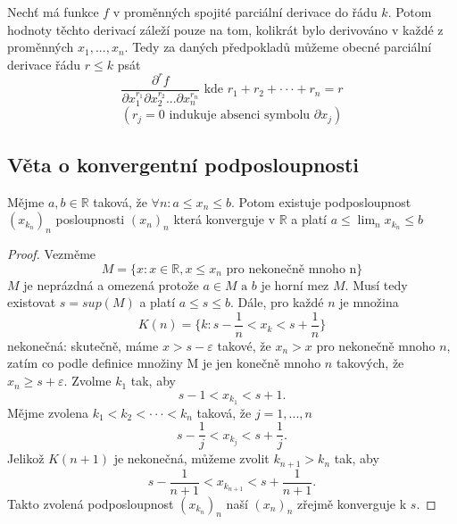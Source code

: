 \documentclass[../main.tex]{subfiles}
\begin{document}
\begin{consequence}
	Nechť má funkce $f$ v proměnných spojité parciální derivace do řádu $k$. Potom hodnoty těchto derivací
	záleží pouze na tom, kolikrát bylo derivováno v každé z proměnných $x_1, ... , x_n$.
	Tedy za daných předpokladů můžeme obecné parciální derivace řádu $r \leq k$ psát
	\[\frac{\partial ^r f}{\partial x^{r_1}_1 \partial x^{r_2}_2 ... \partial x_n^{r_n}} \text{ kde } r_1 + r_2 + \cdot \cdot \cdot + r_n = r \]
	\[(r_j = 0 \text{ indukuje absenci symbolu } \partial x_j)\]
\end{consequence}

\subsection{Věta o konvergentní podposloupnosti}
\begin{theorem}
	Mějme $a,b \in \mathbb{R}$ taková, že $\forall n: a \leq x_n \leq b$. Potom existuje podposloupnost
	$(x_{k_n})_n$ posloupnosti $(x_n)_n$ která konverguje v $\mathbb{R}$ a platí
	$a \leq \lim_n x_{k_n} \leq b$
\end{theorem}

\begin{proof}
	Vezměme \[M = \{x : x \in \mathbb{R}, x \leq x_n \text{ pro nekonečně mnoho n}\}\]
	$M$ je neprázdná a omezená protože $a \in M \text{ a } b$ je horní mez $M$. Musí tedy existovat $s = sup(M)$ a platí 
	$a \leq s \leq b$. Dále, pro každé $n$ je množina 
	\[K(n) = \{k : s - \frac{1}{n} < x_k < s + \frac{1}{n}\}\]
	nekonečná: skutečně, máme $x > s - \varepsilon$ takové, že $x_n > x$ pro nekonečně mnoho $n$, zatím co podle definice množiny M je jen
	konečně mnoho $n$ takových, že $x_n \geq s + \varepsilon$. 
	Zvolme $k_1$ tak, aby
	\[s - 1 < x_{k_{1}} < s+1.\]
	Mějme zvolena $k_1 < k_2 < \cdot \cdot \cdot < k_n$ taková, že $j = 1,...,n$
	\[s - \frac{1}{j} < x_{k_j} < s + \frac{1}{j}.\]
	Jelikož $K(n+1)$ je nekonečná, můžeme zvolit $k_{n+1} > k_n$ tak, aby
	\[s - \frac{1}{n+1} < x_{k_{n+1}} < s + \frac{1}{n+1}.\]
	Takto zvolená podposloupnost $(x_{k_n})_n$ naší $(x_n)_n$ zřejmě konverguje k $s$.
\end{proof}
\end{document}
